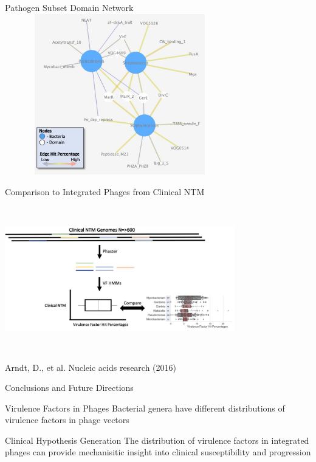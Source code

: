 \documentclass[11pt, xcolor=table]{beamer}
\begin{document}
	\begin{frame}{Pathogen Subset Domain Network}
	\center
	\includegraphics[height=7cm, width=10cm]{CPBS_11_18/Pathogenic.jpg}
	\end{frame}
	\begin{frame}{Comparison to Integrated Phages from Clinical NTM}
  \center
	\includegraphics[height=7cm, width=10cm]{CPBS_11_18/ClinicalNTM.jpg} \\
	\tiny{Arndt, D., et al. Nucleic acids research (2016)}
	
	\end{frame}
	\begin{frame}{Conclusions and Future Directions}
	\begin{block}{Virulence Factors in Phages}
	Bacterial genera have different distributions of virulence factors in phage vectors
	\end{block}
	
	\begin{block}{Clinical Hypothesis Generation}
	The distribution of virulence factors in integrated phages can provide mechanisitic insight into clinical susceptibility and progression 
	\end{block}
	
	\end{frame}
	
\end{document}
